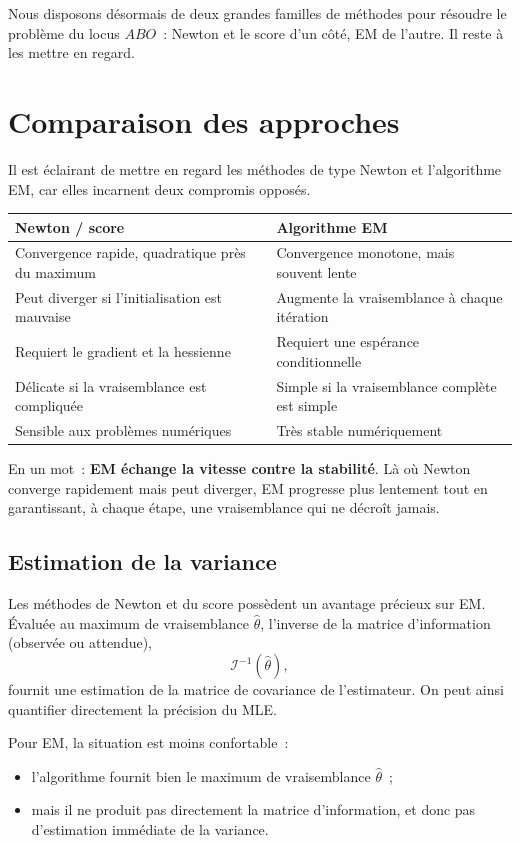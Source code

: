 Nous disposons désormais de deux grandes familles de méthodes pour résoudre le
problème du locus $ABO$~: Newton et le score d'un côté, EM de l'autre. Il reste à
les mettre en regard.

\section{Comparaison des approches}

Il est éclairant de mettre en regard les méthodes de type Newton et l'algorithme
EM, car elles incarnent deux compromis opposés.

\begin{center}
\begin{tabular}{p{6.1cm}p{6.1cm}}
\hline
\textbf{Newton / score} & \textbf{Algorithme EM} \\
\hline
Convergence rapide, quadratique près du maximum
  & Convergence monotone, mais souvent lente \\
Peut diverger si l'initialisation est mauvaise
  & Augmente la vraisemblance à chaque itération \\
Requiert le gradient et la hessienne
  & Requiert une espérance conditionnelle \\
Délicate si la vraisemblance est compliquée
  & Simple si la vraisemblance complète est simple \\
Sensible aux problèmes numériques
  & Très stable numériquement \\
\hline
\end{tabular}
\end{center}

En un mot~: \textbf{EM échange la vitesse contre la stabilité}. Là où Newton
converge rapidement mais peut diverger, EM progresse plus lentement tout en
garantissant, à chaque étape, une vraisemblance qui ne décroît jamais.

\subsection{Estimation de la variance}

Les méthodes de Newton et du score possèdent un avantage précieux sur EM.
Évaluée au maximum de vraisemblance $\hat{\theta}$, l'inverse de la matrice
d'information (observée ou attendue),
$$
\mathcal{I}^{-1}(\hat{\theta}),
$$
fournit une estimation de la matrice de covariance de l'estimateur. On peut ainsi
quantifier directement la précision du MLE.

Pour EM, la situation est moins confortable~:
\begin{itemize}
  \item l'algorithme fournit bien le maximum de vraisemblance $\hat{\theta}$~;
  \item mais il ne produit pas directement la matrice d'information, et donc pas
        d'estimation immédiate de la variance.
\end{itemize}

